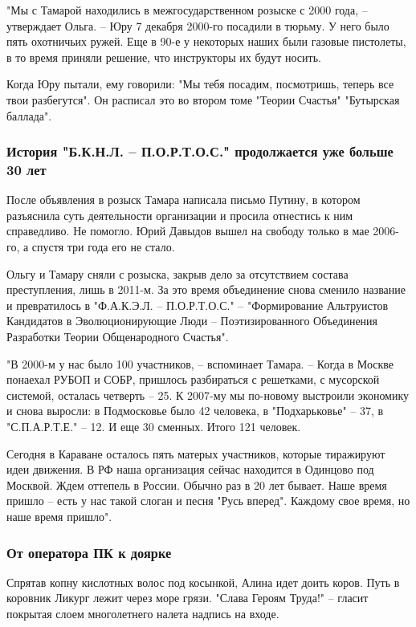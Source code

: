 "Мы с Тамарой находились в межгосударственном розыске с 2000 года, – утверждает
Ольга. – Юру 7 декабря 2000-го посадили в тюрьму. У него было пять охотничьих
ружей. Еще в 90-е у некоторых наших были газовые пистолеты, в то время приняли
решение, что инструкторы их будут носить.

Когда Юру пытали, ему говорили: "Мы тебя посадим, посмотришь, теперь все твои
разбегутся". Он расписал это во втором томе "Теории Счастья" "Бутырская
баллада".

\subsubsection{История "Б.К.Н.Л. – П.О.Р.Т.О.С." продолжается уже больше 30 лет}

После объявления в розыск Тамара написала письмо Путину, в котором разъяснила
суть деятельности организации и просила отнестись к ним справедливо. Не
помогло. Юрий Давыдов вышел на свободу только в мае 2006-го, а спустя три года
его не стало. 

Ольгу и Тамару сняли с розыска, закрыв дело за отсутствием состава
преступления, лишь в 2011-м. За это время объединение снова сменило название и
превратилось в "Ф.А.К.Э.Л. – П.О.Р.Т.О.С." – "Формирование Альтруистов
Кандидатов в Эволюционирующие Люди – Поэтизированного Объединения Разработки
Теории Общенародного Счастья".

"В 2000-м у нас было 100 участников, – вспоминает Тамара. – Когда в Москве
понаехал РУБОП и СОБР, пришлось разбираться с решетками, с мусорской системой,
осталась четверть – 25. К 2007-му мы по-новому выстроили экономику и снова
выросли: в Подмосковье было 42 человека, в "Подхарьковье" – 37, в
"С.П.А.Р.Т.Е." – 12. И еще 30 сменных. Итого 121 человек. 

Сегодня в Караване осталось пять матерых участников, которые тиражируют идеи
движения. В РФ наша организация сейчас находится в Одинцово под Москвой. Ждем
оттепель в России. Обычно раз в 20 лет бывает. Наше время пришло – есть у нас
такой слоган и песня "Русь вперед". Каждому свое время, но наше время пришло".

\subsubsection{От оператора ПК к доярке}

Спрятав копну кислотных волос под косынкой, Алина идет доить коров. Путь в
коровник Ликург лежит через море грязи. "Слава Героям Труда!" – гласит покрытая
слоем многолетнего налета надпись на входе.

